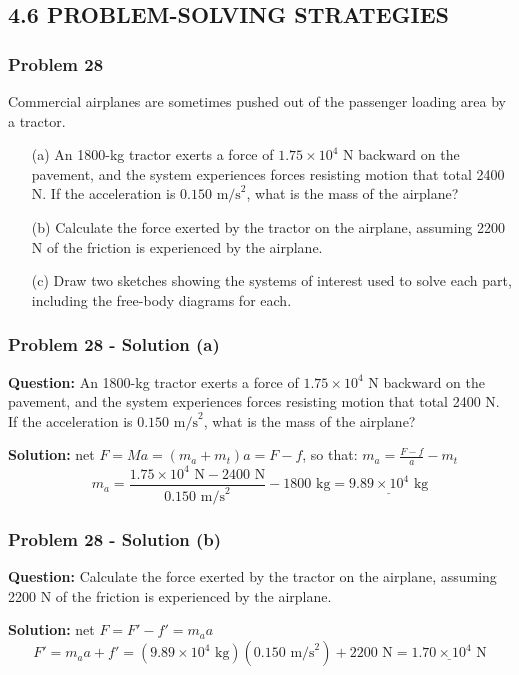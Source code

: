 \documentclass{beamer}
\begin{document}
\begin{}
\section{4.6 PROBLEM-SOLVING STRATEGIES}

\begin{frame}
\frametitle{Problem 28}
Commercial airplanes are sometimes pushed out of the passenger loading area by a tractor.
\begin{itemize}
    \item[(a)] An 1800-kg tractor exerts a force of $1.75 \times 10^{4} \text{ N}$ backward on the pavement, and the system experiences forces resisting motion that total 2400 N. If the acceleration is $0.150 \text{ m/s}^{2}$, what is the mass of the airplane?
    \item[(b)] Calculate the force exerted by the tractor on the airplane, assuming 2200 N of the friction is experienced by the airplane.
    \item[(c)] Draw two sketches showing the systems of interest used to solve each part, including the free-body diagrams for each.
\end{itemize}
\end{frame}

\begin{frame}
\frametitle{Problem 28 - Solution (a)}
\textbf{Question:} An 1800-kg tractor exerts a force of $1.75 \times 10^{4} \text{ N}$ backward on the pavement, and the system experiences forces resisting motion that total 2400 N. If the acceleration is $0.150 \text{ m/s}^{2}$, what is the mass of the airplane?

\vspace{0.5cm}

\textbf{Solution:}
net $F = Ma = (m_a + m_t)a = F - f$, so that: $m_a = \frac{F - f}{a} - m_t$
\begin{equation*}
m_a = \frac{1.75 \times 10^{4} \text{ N} - 2400 \text{ N}}{0.150 \text{ m/s}^{2}} - 1800 \text{ kg} = \underline{9.89 \times 10^{4} \text{ kg}}
\end{equation*}
\end{frame}

\begin{frame}
\frametitle{Problem 28 - Solution (b)}
\textbf{Question:} Calculate the force exerted by the tractor on the airplane, assuming 2200 N of the friction is experienced by the airplane.

\vspace{0.5cm}

\textbf{Solution:}
net $F = F' - f' = m_a a$
\begin{equation*}
F' = m_a a + f' = (9.89 \times 10^{4} \text{ kg})(0.150 \text{ m/s}^{2}) + 2200 \text{ N} = \underline{1.70 \times 10^{4} \text{ N}}
\end{equation*}
\end{frame}


\end{}
\end{document}
